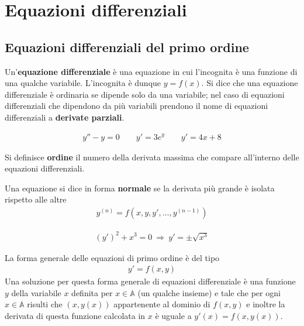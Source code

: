 \documentclass[a4paper, oneside]{book}
\begin{document}
\chapter{Equazioni differenziali}
\section{Equazioni differenziali del primo ordine}
\begin{definition}
    Un'\textbf{equazione differenziale} è una equazione in cui l'incognita è una funzione 
    di una qualche variabile. L'incognita è dunque $y = f(x)$. Si dice che una equazione differenziale
    è ordinaria se dipende solo da una variabile; nel caso di equazioni differenziali
    che dipendono da più variabili prendono il nome di equazioni differenziali a
    \textbf{derivate parziali}.
\end{definition}

\begin{example}
    \begin{gather*}
        y'' - y = 0 \qquad y' = 3e^{y}  \qquad y' = 4x + 8
    \end{gather*}
\end{example}

\begin{definition}[Ordine]
    Si definisce \textbf{ordine} il numero della derivata massima che
    compare all'interno delle equazioni differenziali. 
\end{definition}

\begin{definition}
    Una equazione si dice in forma \textbf{normale} se la derivata più grande è
    isolata rispetto alle altre
    \begin{align}
        y^{(n)} = f(x, y, y', \dots, y^{(n - 1)} )
    \end{align}
\end{definition}
\begin{example}
    \begin{gather*}
        (y')^{2} + x^{3} = 0   \ \Longrightarrow \ y ' = \pm \sqrt{x^{3} } 
    \end{gather*}
\end{example}

\begin{definition}
La forma generale delle equazioni di primo ordine è del tipo
\begin{align}
    y' = f(x, y)
\end{align}
Una soluzione per questa forma generale di equazioni differenziale è una
funzione $y$ della variabile $x$ definita per $x \in \mathbb{A}$ (un qualche insieme)
e tale che per ogni $x \in \mathbb{A}$ risulti che $(x, y(x))$ appartenente al dominio di
$f(x, y)$ e inoltre la derivata di questa funzione calcolata in $x$ è uguale a $y'(x) = f(x, y(x))$.    
\end{definition}
\end{document}

